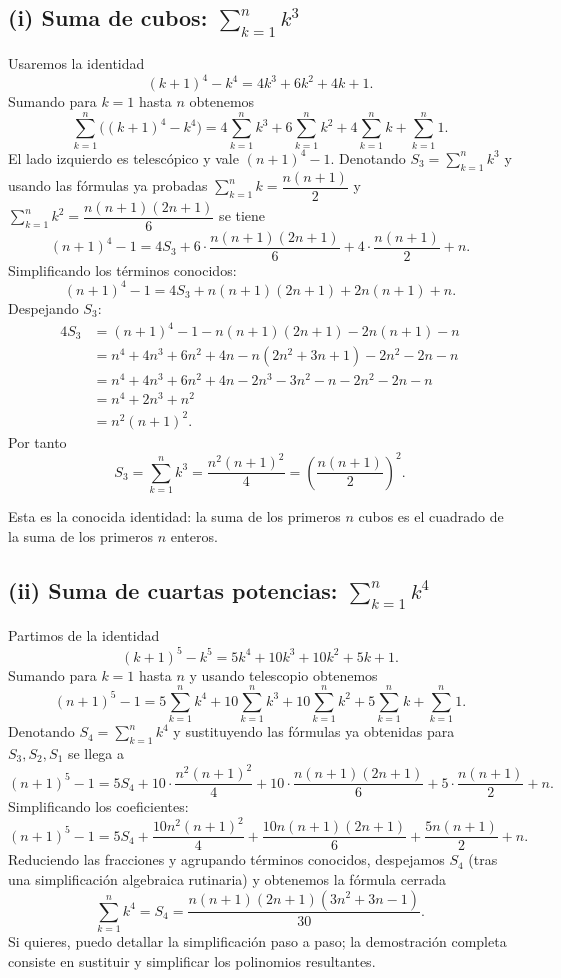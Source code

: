 \subsection*{(i) Suma de cubos: $\displaystyle\sum_{k=1}^n k^3$}
Usaremos la identidad
\[
(k+1)^4-k^4=4k^3+6k^2+4k+1.
\]
Sumando para $k=1$ hasta $n$ obtenemos
\[
\sum_{k=1}^n\big((k+1)^4-k^4\big)=4\sum_{k=1}^n k^3+6\sum_{k=1}^n k^2+4\sum_{k=1}^n k+\sum_{k=1}^n 1.
\]
El lado izquierdo es telescópico y vale $(n+1)^4-1$. Denotando $S_3=\sum_{k=1}^n k^3$ y usando las fórmulas ya probadas $\sum_{k=1}^n k=\dfrac{n(n+1)}{2}$ y $\sum_{k=1}^n k^2=\dfrac{n(n+1)(2n+1)}{6}$ se tiene
\[
(n+1)^4-1=4S_3+6\cdot\frac{n(n+1)(2n+1)}{6}+4\cdot\frac{n(n+1)}{2}+n.
\]
Simplificando los términos conocidos:
\[
(n+1)^4-1=4S_3+n(n+1)(2n+1)+2n(n+1)+n.
\]
Despejando $S_3$:
\begin{align*}
4S_3 &= (n+1)^4-1 - n(n+1)(2n+1)-2n(n+1)-n \\
&= n^4+4n^3+6n^2+4n - n(2n^2+3n+1)-2n^2-2n-n \\
&= n^4+4n^3+6n^2+4n -2n^3-3n^2-n -2n^2-2n-n \\
&= n^4+2n^3+n^2 \\
&= n^2(n+1)^2.
\end{align*}
Por tanto
\[
S_3=\sum_{k=1}^n k^3=\frac{n^2(n+1)^2}{4}=\left(\frac{n(n+1)}{2}\right)^2.
\]

Esta es la conocida identidad: la suma de los primeros $n$ cubos es el cuadrado de la suma de los primeros $n$ enteros.

\subsection*{(ii) Suma de cuartas potencias: $\displaystyle\sum_{k=1}^n k^4$}

Partimos de la identidad
\[
(k+1)^5-k^5=5k^4+10k^3+10k^2+5k+1.
\]
Sumando para $k=1$ hasta $n$ y usando telescopio obtenemos
\[
(n+1)^5-1=5\sum_{k=1}^n k^4+10\sum_{k=1}^n k^3+10\sum_{k=1}^n k^2+5\sum_{k=1}^n k+\sum_{k=1}^n1.
\]
Denotando $S_4=\sum_{k=1}^n k^4$ y sustituyendo las fórmulas ya obtenidas para $S_3,S_2,S_1$ se llega a
\[
(n+1)^5-1=5S_4+10\cdot\frac{n^2(n+1)^2}{4}+10\cdot\frac{n(n+1)(2n+1)}{6}+5\cdot\frac{n(n+1)}{2}+n.
\]
Simplificando los coeficientes:
\[
(n+1)^5-1=5S_4+\frac{10n^2(n+1)^2}{4}+\frac{10n(n+1)(2n+1)}{6}+\frac{5n(n+1)}{2}+n.
\]
Reduciendo las fracciones y agrupando términos conocidos, despejamos $S_4$ (tras una simplificación algebraica rutinaria) y obtenemos la fórmula cerrada
\[
\sum_{k=1}^n k^4 = S_4 = \frac{n(n+1)(2n+1)(3n^2+3n-1)}{30}.
\]
Si quieres, puedo detallar la simplificación paso a paso; la demostración completa consiste en sustituir y simplificar los polinomios resultantes.

